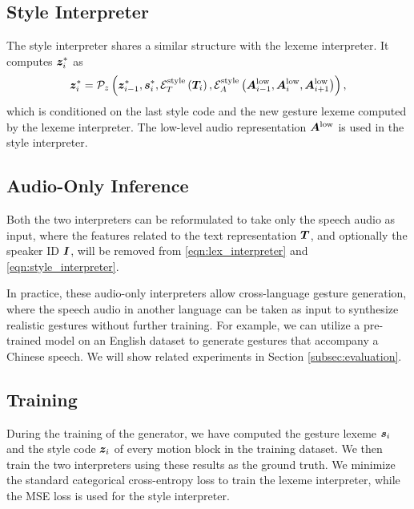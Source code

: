 \subsection{Style Interpreter}
The style interpreter shares a similar structure with the lexeme interpreter. It computes $\bm{z}_{i}^*$ as
\begin{equation}
    {\bm{z}}_{i}^{*} = \mathcal{P}_z\left(
        \bm{z}_{i-1}^*,
        \bm{s}_{i}^*,
        \mathcal{E}_T^{{\text{style}}}\left(\bm{T}_i\right), 
        \mathcal{E}_A^{{\text{style}}}\left(\bm{A}^{{\text{low}}}_{i-1},\bm{A}^{{\text{low}}}_{i},\bm{A}^{{\text{low}}}_{i+1}\right)
        \right),
    \label{eqn:style_interpreter}
\end{equation}
which is conditioned on the last style code and the new gesture lexeme computed by the lexeme interpreter. The low-level audio representation $\bm{A}^{{\text{low}}}$ is used in the style interpreter.

\subsection{Audio-Only Inference}
\label{subsec:inference_based_on_audio_only}
Both the two interpreters can be reformulated to take only the speech audio as input, where the features related to the text representation $\bm{T}$, and optionally the speaker ID $\bm{I}$, will be removed from \eqn\eqref{eqn:lex_interpreter} and \eqref{eqn:style_interpreter}.

In practice, these audio-only interpreters allow cross-language gesture generation, where the speech audio in another language can be taken as input to synthesize realistic gestures without further training. For example, we can utilize a pre-trained model on an English dataset to generate gestures that accompany a Chinese speech. We will show related experiments in Section \ref{subsec:evaluation}.

\subsection{Training}
During the training of the generator, we have computed the gesture lexeme $\bm{s}_i$ and the style code $\bm{z}_i$ of every motion block in the training dataset. We then train the two interpreters using these results as the ground truth. We minimize the standard categorical cross-entropy loss to train the lexeme interpreter, while the MSE loss is used for the style interpreter.

